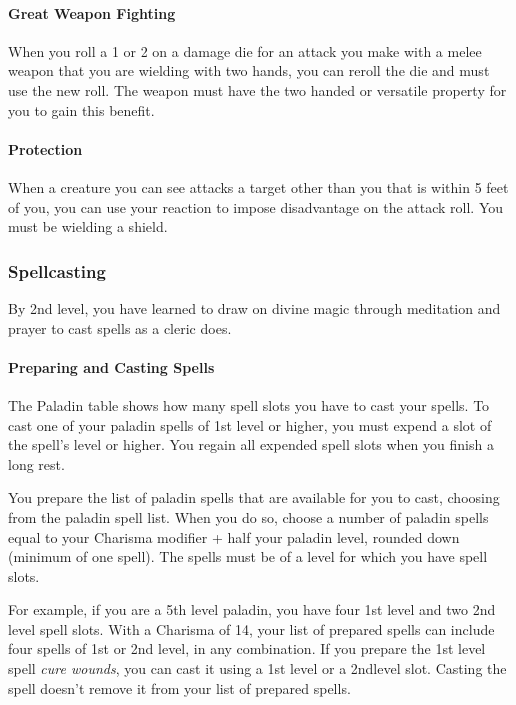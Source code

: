 \documentclass[
]{article}
\begin{document}
\hypertarget{great-weapon-fighting}{%
\paragraph{Great Weapon Fighting}\label{great-weapon-fighting}}

When you roll a 1 or 2 on a damage die for an attack you make with a
melee weapon that you are wielding with two hands, you can reroll the
die and must use the new roll. The weapon must have the two handed or
versatile property for you to gain this benefit.

\hypertarget{protection}{%
\paragraph{Protection}\label{protection}}

When a creature you can see attacks a target other than you that is
within 5 feet of you, you can use your reaction to impose disadvantage
on the attack roll. You must be wielding a shield.

\hypertarget{spellcasting}{%
\subsubsection{Spellcasting}\label{spellcasting}}

By 2nd level, you have learned to draw on divine magic through
meditation and prayer to cast spells as a cleric does.

\hypertarget{preparing-and-casting-spells}{%
\paragraph{Preparing and Casting
Spells}\label{preparing-and-casting-spells}}

The Paladin table shows how many spell slots you have to cast your
spells. To cast one of your paladin spells of 1st level or higher, you
must expend a slot of the spell's level or higher. You regain all
expended spell slots when you finish a long rest.

You prepare the list of paladin spells that are available for you to
cast, choosing from the paladin spell list. When you do so, choose a
number of paladin spells equal to your Charisma modifier + half your
paladin level, rounded down (minimum of one spell). The spells must be
of a level for which you have spell slots.

For example, if you are a 5th level paladin, you have four 1st level and
two 2nd level spell slots. With a Charisma of 14, your list of prepared
spells can include four spells of 1st or 2nd level, in any combination.
If you prepare the 1st level spell \emph{cure wounds}, you can cast it
using a 1st level or a 2ndlevel slot. Casting the spell doesn't remove
it from your list of prepared spells.
\end{document}
